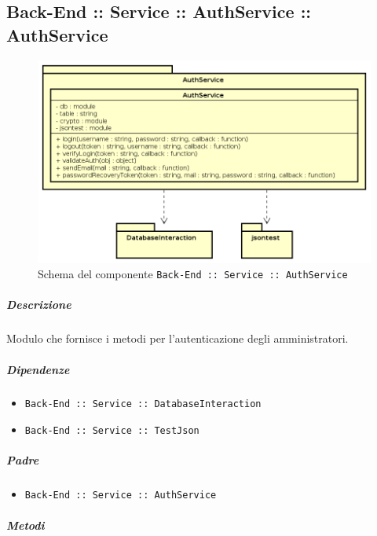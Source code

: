 \documentclass[../ManualeSviluppatore_v2.0.0.tex]{subfiles}
\begin{document}
\subsection{Back-End :: Service :: AuthService :: AuthService}
\begin{figure}[!h]
	\centering
	\includegraphics[scale=0.6]{Architettura/Back-End/Service/AuthService.png}
	\caption{Schema del componente \texttt{Back-End :: Service :: AuthService}}
\end{figure}
\subparagraph{Descrizione} Modulo che fornisce i metodi per l'autenticazione degli amministratori.
\subparagraph{Dipendenze}
\begin{itemize}
	\item \texttt{Back-End :: Service :: DatabaseInteraction}
	\item \texttt{Back-End :: Service :: TestJson}
\end{itemize}
\subparagraph{Padre}
\begin{itemize}
	\item \texttt{Back-End :: Service :: AuthService}
\end{itemize}
\subparagraph{Metodi}
\end{document}
